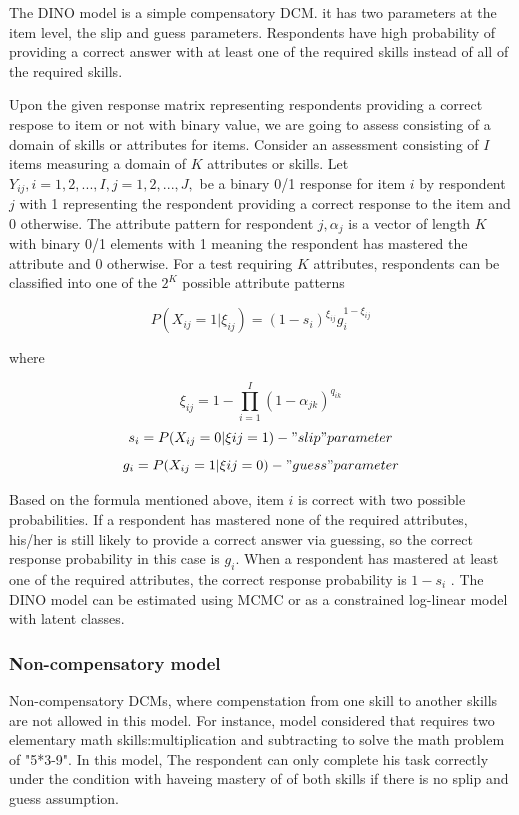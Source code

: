 \documentclass[11pt]{article}
\begin{document}
The DINO model is a simple compensatory DCM. it has two parameters at the item level, the slip and guess parameters. Respondents have high probability of providing a correct answer with at least one of the
required skills instead of all of the required skills.

Upon the given response matrix representing respondents providing a correct respose to item or not with binary value, we are going to assess consisting of a domain of skills or attributes for items. Consider an assessment consisting of $I$ items measuring a domain of $K$ attributes
or skills. Let $Y_{ij} , i=1,2,..., I, j=1,2,...,J,$ be a binary 0/1 response for item $i$ by respondent
$j$ with 1 representing the respondent providing a correct response to the item and 0
otherwise. The attribute pattern for respondent $j, \alpha_j$ is a vector of length $K$ with binary 0/1
elements with 1 meaning the respondent has mastered the attribute and 0 otherwise. For
a test requiring $K$ attributes, respondents can be classified into one of the $2^K$ possible
attribute patterns

$$P (X_{ij}=1|\xi_{ij})=(1-s_i)^{\xi_{ij}}g_i^{1-\xi_{ij}}$$  

where 

$$\xi_{ij}=1 - \prod\limits_{i=1}^I (1-\alpha_{jk})^{q_{ik}}$$
$$ s_i= P(X_{ij}=0|\xi{ij}=1)-"slip" parameter $$
$$ g_i= P(X_{ij}=1|\xi{ij}=0)-"guess" parameter $$
  
Based on the formula mentioned above, item $i$ is correct with two possible probabilities. If a respondent has mastered none of the required attributes, his/her is still
likely to provide a correct answer via guessing, so the correct response probability in this
case is $g_i$. When a respondent has mastered at least one of the required attributes, the
correct response probability is $1−s_i$ . The DINO model can be estimated using
MCMC\cite{templin2006measurement} or as a constrained log-linear model with latent
classes.

\subsubsection{Non-compensatory model}
 Non-compensatory DCMs, where compenstation from one skill to another skills are not allowed in this model. For instance, model considered that requires two elementary math skills:multiplication and subtracting to solve the math problem of "5*3-9". In this model, The respondent can only complete his task correctly under the condition with haveing mastery of of both skills if there is no splip and guess assumption. 
 
\end{document}
